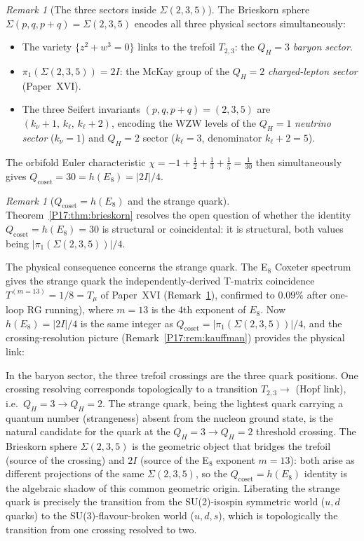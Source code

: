 \documentclass[11pt,a4paper]{article}
\theoremstyle{definition}\newtheorem{definition}[theorem]{Definition}
\theoremstyle{remark}
\newtheorem{remark}[theorem]{Remark}
\newcommand{\twoI}{2I}
\newcommand{\QH}{Q_H}
\begin{document}
\begin{remark}[The three sectors inside $\Sigma(2,3,5)$]
\label{P17:rem:brieskorn_sectors}
The Brieskorn sphere $\Sigma(p,q,p+q)=\Sigma(2,3,5)$ encodes all
three physical sectors simultaneously:
\begin{itemize}[nosep]
\item The variety $\{z^2+w^3=0\}$ links to the trefoil $T_{2,3}$:
  the $\QH=3$ \emph{baryon sector}.
\item $\pi_1(\Sigma(2,3,5))=\twoI$: the McKay group of the $\QH=2$
  \emph{charged-lepton sector} (Paper~XVI).
\item The three Seifert invariants $(p,q,p+q)=(2,3,5)$ are
  $(k_\nu+1,\,k_\ell,\,k_\ell+2)$, encoding the WZW levels of the
  $\QH=1$ \emph{neutrino sector} ($k_\nu=1$) and $\QH=2$ sector
  ($k_\ell=3$, denominator $k_\ell+2=5$).
\end{itemize}
The orbifold Euler characteristic $\chi=-1+\tfrac12+\tfrac13+\tfrac15=\tfrac{1}{30}$
then simultaneously gives $Q_{\mathrm{coset}}=30=h(E_8)=|\twoI|/4$.
\end{remark}

\begin{remark}[$Q_{\mathrm{coset}}=h(E_8)$ and the strange quark]
\label{P17:rem:strange_quark}
Theorem~\ref{P17:thm:brieskorn} resolves the open question of whether the
identity $Q_{\mathrm{coset}}=h(E_8)=30$ is structural or coincidental:
it is structural, both values being $|\pi_1(\Sigma(2,3,5))|/4$.

The physical consequence concerns the strange quark.
The E$_8$ Coxeter spectrum gives the strange quark the independently-derived
T-matrix coincidence $T^{(m=13)}=1/8=T_\mu$ of Paper~XVI
(Remark~\ref{P17:rem:strange_quark}), confirmed to $0.09\%$ after one-loop
RG running), where $m=13$ is the 4th exponent of $E_8$. Now 
$h(E_8)=|\twoI|/4$ is the same integer as $Q_{\mathrm{coset}}=
|\pi_1(\Sigma(2,3,5))|/4$, and the crossing-resolution picture
(Remark~\ref{P17:rem:kauffman}) provides the physical link:

In the baryon sector, the three trefoil crossings are the three quark
positions.  One crossing resolving corresponds topologically to a transition
$T_{2,3}\to$ (Hopf link), i.e.\ $\QH=3\to\QH=2$.  The strange quark,
being the lightest quark carrying a quantum number (strangeness) absent
from the nucleon ground state, is the natural candidate for the quark at
the $\QH=3\to\QH=2$ threshold crossing.  The Brieskorn sphere
$\Sigma(2,3,5)$ is the geometric object that bridges the trefoil (source
of the crossing) and $\twoI$ (source of the E$_8$ exponent $m=13$): both
arise as different projections of the same $\Sigma(2,3,5)$, so the
$Q_{\mathrm{coset}}=h(E_8)$ identity is the algebraic shadow of this
common geometric origin. Liberating the strange quark is precisely the transition from
the SU(2)-isospin symmetric world ($u,d$ quarks) to the SU(3)-flavour-broken
world ($u,d,s$), which is topologically the transition from one crossing
resolved to two.

\end{remark}
\end{document}

